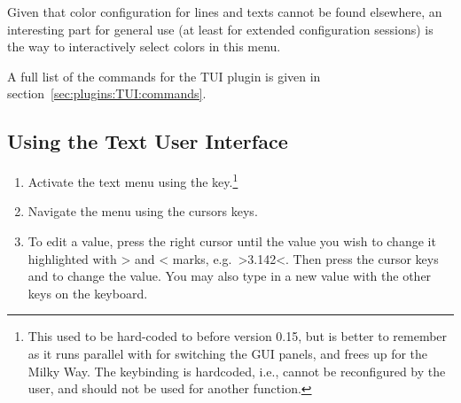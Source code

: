 Given that color configuration for lines and texts cannot be found
elsewhere, an interesting part for general use (at least for extended
configuration sessions) is the way to interactively select colors in
this menu.

A full list of the commands for the TUI plugin is
given in section~\ref{sec:plugins:TUI:commands}. 

\subsection{Using the Text User Interface}
\label{sec:plugins:TUI:using}

\begin{enumerate}
\item Activate the text menu using the  key.\footnote{This
    used to be hard-coded to  before version 0.15, but
     is better to remember as it runs parallel with
     for switching the GUI panels, and frees up 
    for the Milky Way. The  keybinding is hardcoded, i.e.,
    cannot be reconfigured by the user, and should not be used for
    another function.}
\item
  Navigate the menu using the cursors keys.
\item
  To edit a value, press the right cursor until the value you wish to
  change it highlighted with \textgreater{} and \textless{} marks, e.g.\
  \textgreater{}3.142\textless{}. Then press the cursor keys \keys{\arrowkeyup} and \keys{\arrowkeydown} to
  change the value. You may also type in a new value with the other keys
  on the keyboard.
\end{enumerate}


